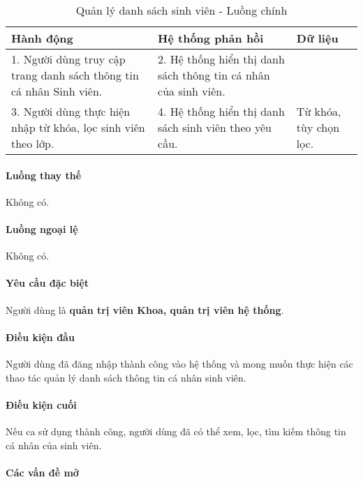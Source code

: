 \documentclass[./../main.tex]{subfiles}
\begin{document}
\begin{table}[H]
  \caption{Quản lý danh sách sinh viên - Luồng chính}
  \label{tab:orgAdmin_manage_students}
  \begin{tabularx}{\textwidth}{|X|X|X|}
    \hline
\textbf{Hành động} & \textbf{Hệ thống phản hồi} & \textbf{Dữ liệu} \\ \hline
1. Người dùng truy cập trang danh sách thông tin cá nhân Sinh viên. & 2. Hệ thống hiển thị danh sách thông tin cá nhân của sinh viên. &  \\ \hline
3. Người dùng thực hiện nhập từ khóa, lọc sinh viên theo lớp. & 4. Hệ thống hiển thị danh sách sinh viên theo yêu cầu. & Từ khóa, tùy chọn lọc. \\ \hline
  \end{tabularx}
\end{table}

\paragraph*{Luồng thay thế} Không có.

\paragraph*{Luồng ngoại lệ} Không có.

\paragraph*{Yêu cầu đặc biệt}

Người dùng là \textbf{quản trị viên Khoa, quản trị viên hệ thống}.

\paragraph*{Điều kiện đầu}

Người dùng đã đăng nhập thành công vào hệ thống và mong muốn thực hiện các thao tác quản lý danh sách thông tin cá nhân sinh viên.

\paragraph*{Điều kiện cuối}

Nếu ca sử dụng thành công, người dùng đã có thể xem, lọc, tìm kiếm thông tin cá nhân của sinh viên.

\paragraph*{Các vấn đề mở}
\end{document}
